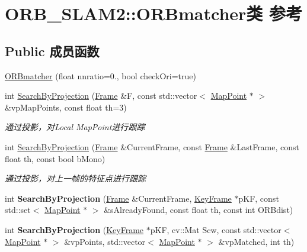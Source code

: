 \hypertarget{classORB__SLAM2_1_1ORBmatcher}{\section{O\-R\-B\-\_\-\-S\-L\-A\-M2\-:\-:O\-R\-Bmatcher类 参考}
\label{classORB__SLAM2_1_1ORBmatcher}
}
\subsection*{Public 成员函数}
\begin{DoxyCompactItemize}
\item 
\hyperlink{classORB__SLAM2_1_1ORBmatcher_a6ca536b80e44da0f56fcd35ff8c6a833}{O\-R\-Bmatcher} (float nnratio=0., bool check\-Ori=true)
\item 
int \hyperlink{classORB__SLAM2_1_1ORBmatcher_a27c18d6977e8ec20b196e0b2fa6043cd}{Search\-By\-Projection} (\hyperlink{classORB__SLAM2_1_1Frame}{Frame} \&F, const std\-::vector$<$ \hyperlink{classORB__SLAM2_1_1MapPoint}{Map\-Point} $\ast$ $>$ \&vp\-Map\-Points, const float th=3)
\begin{DoxyCompactList}\small\item\em 通过投影，对\-Local Map\-Point进行跟踪 \end{DoxyCompactList}\item 
int \hyperlink{classORB__SLAM2_1_1ORBmatcher_a0dba0b2bed7d16ca56e27ff4df00f557}{Search\-By\-Projection} (\hyperlink{classORB__SLAM2_1_1Frame}{Frame} \&Current\-Frame, const \hyperlink{classORB__SLAM2_1_1Frame}{Frame} \&Last\-Frame, const float th, const bool b\-Mono)
\begin{DoxyCompactList}\small\item\em 通过投影，对上一帧的特征点进行跟踪 \end{DoxyCompactList}\item 
\hypertarget{classORB__SLAM2_1_1ORBmatcher_a8cc723f3364b90ac6b68b969dca0cabe}{int {\bfseries Search\-By\-Projection} (\hyperlink{classORB__SLAM2_1_1Frame}{Frame} \&Current\-Frame, \hyperlink{classORB__SLAM2_1_1KeyFrame}{Key\-Frame} $\ast$p\-K\-F, const std\-::set$<$ \hyperlink{classORB__SLAM2_1_1MapPoint}{Map\-Point} $\ast$ $>$ \&s\-Already\-Found, const float th, const int O\-R\-Bdist)}\label{classORB__SLAM2_1_1ORBmatcher_a8cc723f3364b90ac6b68b969dca0cabe}

\item 
\hypertarget{classORB__SLAM2_1_1ORBmatcher_a110a51a849fcc485b18987e069f58c84}{int {\bfseries Search\-By\-Projection} (\hyperlink{classORB__SLAM2_1_1KeyFrame}{Key\-Frame} $\ast$p\-K\-F, cv\-::\-Mat Scw, const std\-::vector$<$ \hyperlink{classORB__SLAM2_1_1MapPoint}{Map\-Point} $\ast$ $>$ \&vp\-Points, std\-::vector$<$ \hyperlink{classORB__SLAM2_1_1MapPoint}{Map\-Point} $\ast$ $>$ \&vp\-Matched, int th)}\label{classORB__SLAM2_1_1ORBmatcher_a110a51a849fcc485b18987e069f58c84}


\end{DoxyCompactItemize}
